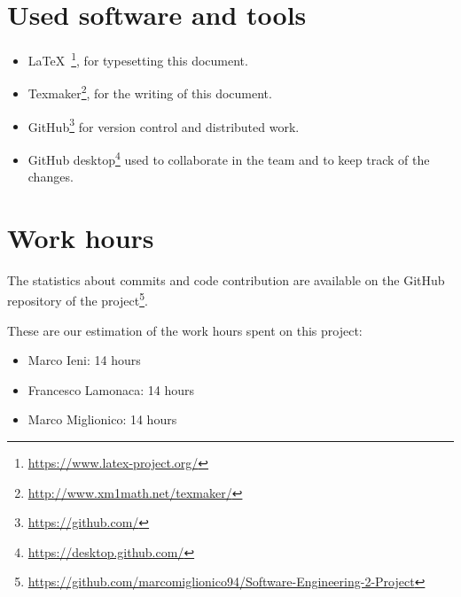 \section{Used software and tools}
\begin{itemize}
    \item \LaTeX\ \footnote{\url{https://www.latex-project.org/}}, for typesetting this document.
    \item Texmaker\footnote{\url{http://www.xm1math.net/texmaker/}}, for the writing of this document.
    \item GitHub\footnote{\url{https://github.com/}} for version control and distributed work.
    \item GitHub desktop\footnote{\url{https://desktop.github.com/}} used to collaborate in the team and to keep track of the changes. 
\end{itemize}

\section{Work hours}
The statistics about commits and code contribution are available on the GitHub repository of the project\footnote{\url{https://github.com/marcomiglionico94/Software-Engineering-2-Project}}.

These are our estimation of the work hours spent on this project:
\begin{itemize}
    \item Marco Ieni: 14 hours
    \item Francesco Lamonaca: 14 hours
    \item Marco Miglionico: 14 hours
\end{itemize}
